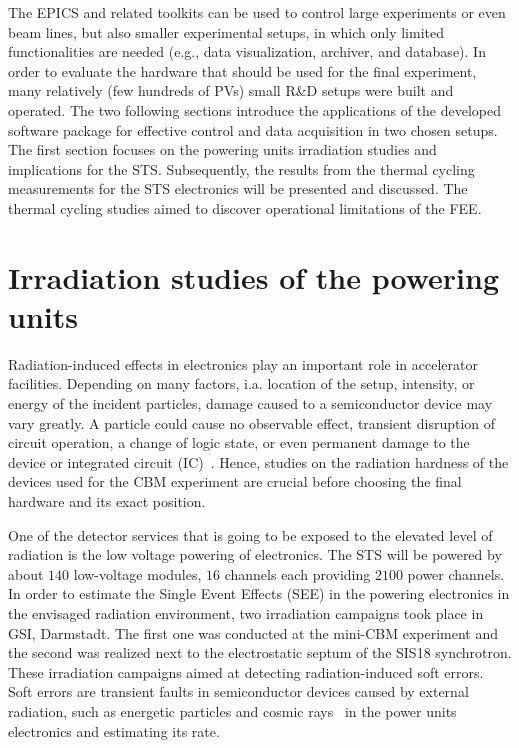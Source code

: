 The \gls{EPICS} and related toolkits can be used to control large experiments or even beam lines, but also smaller experimental setups, in which only limited functionalities are needed (e.g., data visualization, archiver, and database). In order to evaluate the hardware that should be used for the final experiment, many relatively (few hundreds of \glspl{PV}) small R\&D setups were built and operated. %
The two following sections introduce the applications of the developed software package for effective control and data acquisition in two chosen setups. The first section focuses on the powering units irradiation studies and implications for the \gls{STS}. Subsequently, the results from the thermal cycling measurements for the \gls{STS} electronics will be presented and discussed. The thermal cycling studies aimed to discover operational limitations of the \gls{FEE}. 


\section{Irradiation studies of the powering units}

Radiation-induced effects in electronics play an important role in accelerator facilities. Depending on many factors, i.a. location of the setup, intensity, or energy of the incident particles, damage caused to a semiconductor device may vary greatly. A particle could cause no observable effect, transient disruption of circuit operation, a change of logic state, or even permanent damage to the device or integrated circuit (IC)~\cite{dodd}. Hence, studies on the radiation hardness of the devices used for the \gls{CBM} experiment are crucial before choosing the final hardware and its exact position.

One of the detector services that is going to be exposed to the elevated level of radiation is the low voltage powering of electronics. The \gls{STS} will be powered by about $140$ low-voltage modules, $16$ 
channels each providing $2100$ power channels. In order to estimate the Single Event Effects (\gls{SEE}) in the powering electronics in the envisaged radiation environment, two irradiation campaigns took place in \gls{GSI}, Darmstadt.  The first one was conducted at the mini-CBM experiment and the second was realized next to the electrostatic septum of the SIS18 synchrotron. These irradiation campaigns aimed at detecting radiation-induced soft errors. Soft errors are transient faults in semiconductor devices caused by external radiation, such as energetic particles and cosmic rays~\cite{6338321} in the power units electronics and estimating its rate. 

